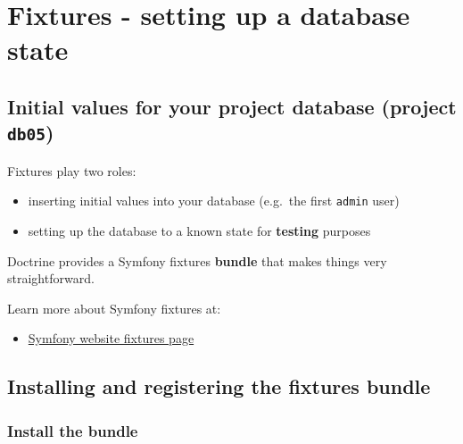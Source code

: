 \documentclass[a4paperpaper,openright]{book}
\providecommand{\tightlist}{%
  \setlength{\itemsep}{0pt}\setlength{\parskip}{0pt}}
\begin{document}
\hypertarget{fixtures---setting-up-a-database-state}{%
\chapter{\texorpdfstring{Fixtures - setting up a database state
\label{chapter_fixtures}}{Fixtures - setting up a database state }}\label{fixtures---setting-up-a-database-state}}

\hypertarget{initial-values-for-your-project-database-project-db05}{%
\section{\texorpdfstring{Initial values for your project database
(project
\texttt{db05})}{Initial values for your project database (project db05)}}\label{initial-values-for-your-project-database-project-db05}}

Fixtures play two roles:

\begin{itemize}
\tightlist
\item
  inserting initial values into your database (e.g.~the first
  \texttt{admin} user)
\item
  setting up the database to a known state for \textbf{testing} purposes
\end{itemize}

Doctrine provides a Symfony fixtures \textbf{bundle} that makes things
very straightforward.

Learn more about Symfony fixtures at:

\begin{itemize}
\tightlist
\item
  \href{https://symfony.com/doc/master/bundles/DoctrineFixturesBundle/index.html}{Symfony
  website fixtures page}
\end{itemize}

\hypertarget{installing-and-registering-the-fixtures-bundle}{%
\section{Installing and registering the fixtures
bundle}\label{installing-and-registering-the-fixtures-bundle}}

\hypertarget{install-the-bundle}{%
\subsection{Install the bundle}\label{install-the-bundle}}
\end{document}
